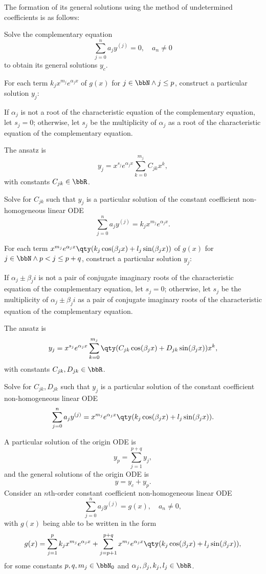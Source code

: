 \documentclass[a4paper,12pt]{article}
\begin{document}
The formation of its general solutions using the method of undetermined coefficients is as follows:
\ben
\item Solve the complementary equation
\[\sum_{j=0}^na_jy^{(j)}=0,\quad a_n\neq 0\]
to obtain its general solutions $y_c$.
\item For each term $k_jx^{m_j}e^{\alpha_jx}$ of $g(x)$ for $j\in\bbN\land j\leq p$, construct a particular solution $y_j$:
\ben
\item If $\alpha_j$ is not a root of the characteristic equation of the complementary equation, let $s_j=0$; otherwise, let $s_j$ be the multiplicity of $\alpha_j$ as a root of the characteristic equation of the complementary equation.
\item The ansatz is
\[y_j=x^{s_j}e^{\alpha_jx}\sum_{k=0}^{m_j}C_{jk}x^k,\]
with constants $C_{jk}\in\bbR$.
\item Solve for $C_{jk}$ such that $y_j$ is a particular solution of the constant coefficient non-homogeneous linear ODE
\[\sum_{j=0}^na_jy^{(j)}=k_jx^{m_j}e^{\alpha_jx}.\]
\een
\item For each term $x^{m_j}e^{\alpha_jx}\qty(k_j\cos(\beta_jx)+l_j\sin(\beta_jx))$ of $g(x)$ for $j\in\bbN\land p<j\leq p+q$, construct a particular solution $y_j$:
\ben
\item If $\alpha_j\pm\beta_ji$ is not a pair of conjugate imaginary roots of the characteristic equation of the complementary equation, let $s_j=0$; otherwise, let $s_j$ be the multiplicity of $\alpha_j\pm\beta_ji$ as a pair of conjugate imaginary roots of the characteristic equation of the complementary equation.
\item The ansatz is
\[y_j=x^{s_j}e^{\alpha_jx}\sum_{k=0}^{m_j}\qty(C_{jk}\cos(\beta_jx)+D_{jk}\sin(\beta_jx))x^k,\]
with constants $C_{jk},D_{jk}\in\bbR$.
\item Solve for $C_{jk},D_{jk}$ such that $y_j$ is a particular solution of the constant coefficient non-homogeneous linear ODE
\[\sum_{j=0}^na_jy^{(j)}=x^{m_j}e^{\alpha_jx}\qty(k_j\cos(\beta_jx)+l_j\sin(\beta_jx)).\]
\een
\item A particular solution of the origin ODE is
\[y_p=\sum_{j=1}^{p+q}y_j,\]
and the general solutions of the origin ODE is
\[y=y_c+y_p.\]
\een
{}
Consider an $n$th-order constant coefficient non-homogeneous linear ODE
\[\sum_{j=0}^na_jy^{(j)}=g(x),\quad a_n\neq 0,\]
with $g(x)$ being able to be written in the form
\[g(x)=\sum_{j=1}^pk_jx^{m_j}e^{\alpha_jx}+\sum_{j=p+1}^{p+q}x^{m_j}e^{\alpha_jx}\qty(k_j\cos(\beta_jx)+l_j\sin(\beta_jx)),\]
for some constants $p,q,m_j\in\bbN_0$ and $\alpha_j,\beta_j,k_j,l_j\in\bbR$.
\end{document}
